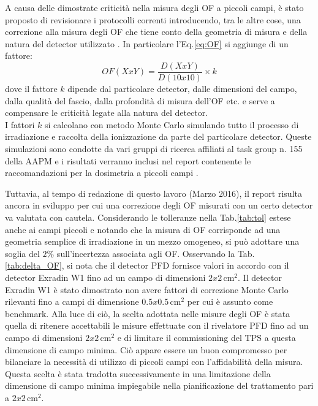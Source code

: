A causa delle dimostrate criticità nella misura degli OF a piccoli campi, è stato proposto di revisionare i protocolli correnti introducendo, tra le altre cose, una correzione alla misura degli OF che tiene conto della geometria di misura e della natura del detector utilizzato \cite{Alfonso2008}. In particolare l'Eq.\eqref{eq:OF} si aggiunge di un fattore:
\begin{equation}
OF(XxY)=\frac{D(XxY)}{D(10x10)}\times k
\end{equation}
dove il fattore $k$ dipende dal particolare detector, dalle dimensioni del campo, dalla qualità del fascio, dalla profondità di misura dell'OF etc. e serve a compensare le criticità legate alla natura del detector.\\
I fattori $k$ si calcolano con metodo Monte Carlo simulando tutto il processo di irradiazione e raccolta della ionizzazione da parte del particolare detector. Queste simulazioni sono condotte da vari gruppi di ricerca affiliati al task group n. 155 della AAPM e i risultati verranno inclusi nel report contenente le raccomandazioni per la dosimetria a piccoli campi \cite{AAPMTG155}. 

Tuttavia, al tempo di redazione di questo lavoro (Marzo 2016), il report risulta ancora in sviluppo per cui una correzione degli OF misurati con un certo detector va valutata con cautela. Considerando le tolleranze nella Tab.\ref{tab:tol} estese anche ai campi piccoli \cite{Low2011} e notando che la misura di OF corrisponde ad una geometria semplice di irradiazione in un mezzo omogeneo, si può adottare una soglia del $2\%$ sull'incertezza associata agli OF. Osservando la Tab.\ref{tab:delta_OF}, si nota che il detector PFD fornisce valori in accordo con il detector Exradin W1 fino ad un campo di dimensioni $2x2\,$cm$^2$. Il detector Exradin W1 è stato dimostrato non avere fattori di correzione Monte Carlo rilevanti fino a campi di dimensione $0.5x0.5\,$cm$^2$ \cite{Francescon2014} per cui è assunto come benchmark. Alla luce di ciò, la scelta adottata nelle misure degli OF è stata quella di ritenere accettabili le misure effettuate con il rivelatore PFD fino ad un campo di dimensioni $2x2\,$cm$^2$ e di limitare il commissioning del TPS a questa dimensione di campo minima. Ciò appare essere un buon compromesso per bilanciare la necessità di utilizzo di piccoli campi con l'affidabilità della misura. Questa scelta è stata tradotta successivamente in una limitazione della dimensione di campo minima impiegabile nella pianificazione del trattamento pari a $2x2\,$cm$^2$.

